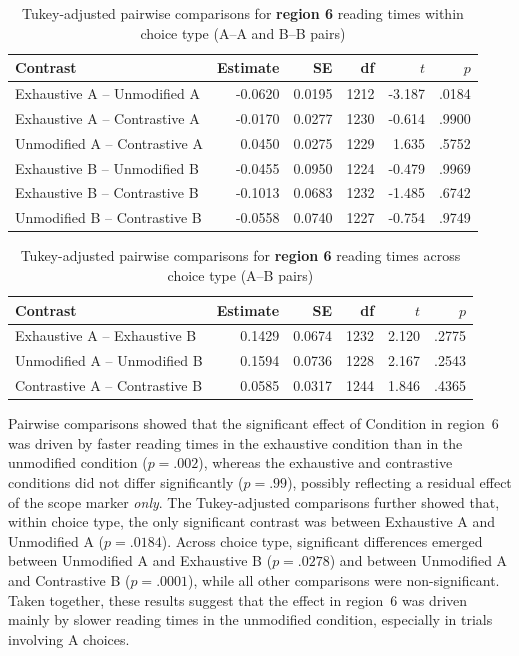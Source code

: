 \documentclass[ruler]{CUP-JNL-LIN}%
\begin{document}
\begin{table}[htbp]
\centering
\caption{Tukey-adjusted pairwise comparisons for \textbf{region 6} reading times within choice type (A--A and B--B pairs)}
\label{tab:r6-pairwise-within-choice}
\begin{tabularx}{\textwidth}{@{}Xrrrrr@{}}
\toprule
Contrast & Estimate & SE & df & $t$ & $p$ \\
\midrule
Exhaustive A -- Unmodified A   & -0.0620 & 0.0195 & 1212 & -3.187 & .0184 \\
Exhaustive A -- Contrastive A  & -0.0170 & 0.0277 & 1230 & -0.614 & .9900 \\
Unmodified A -- Contrastive A  &  0.0450 & 0.0275 & 1229 &  1.635 & .5752 \\
Exhaustive B -- Unmodified B   & -0.0455 & 0.0950 & 1224 & -0.479 & .9969 \\
Exhaustive B -- Contrastive B  & -0.1013 & 0.0683 & 1232 & -1.485 & .6742 \\
Unmodified B -- Contrastive B  & -0.0558 & 0.0740 & 1227 & -0.754 & .9749 \\
\bottomrule
\end{tabularx}
\end{table}

\begin{table}[htbp]
\centering
\caption{Tukey-adjusted pairwise comparisons for \textbf{region 6} reading times across choice type (A--B pairs)}
\label{tab:r6-pairwise-across-choice}
\begin{tabularx}{\textwidth}{@{}Xrrrrr@{}}
\toprule
Contrast & Estimate & SE & df & $t$ & $p$ \\
\midrule
Exhaustive A -- Exhaustive B   &  0.1429 & 0.0674 & 1232 &  2.120 & .2775 \\
Unmodified A -- Unmodified B   &  0.1594 & 0.0736 & 1228 &  2.167 & .2543 \\
Contrastive A -- Contrastive B &  0.0585 & 0.0317 & 1244 &  1.846 & .4365 \\
\bottomrule
\end{tabularx}
\end{table}

Pairwise comparisons showed that the significant effect of Condition in region~6 was driven by faster reading times in the exhaustive condition than in the unmodified condition ($p=.002$), whereas the exhaustive and contrastive conditions did not differ significantly ($p=.99$), possibly reflecting a residual effect of the scope marker \textit{only}. The Tukey-adjusted comparisons further showed that, within choice type, the only significant contrast was between Exhaustive A and Unmodified A ($p=.0184$). Across choice type, significant differences emerged between Unmodified A and Exhaustive B ($p=.0278$) and between Unmodified A and Contrastive B ($p=.0001$), while all other comparisons were non-significant. Taken together, these results suggest that the effect in region~6 was driven mainly by slower reading times in the unmodified condition, especially in trials involving A choices.
\end{document}
